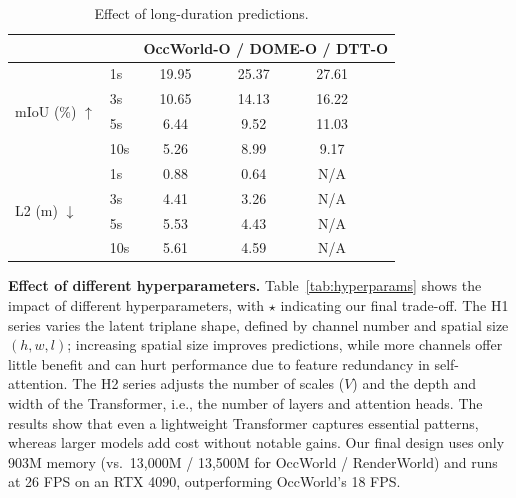 \documentclass[11pt,a4paper]{article}
\begin{document}
\begin{table}[htbp]
  \centering
  \caption{Effect of long-duration predictions.}
  \label{tab:longterm}
  \begin{tabular}{llcccc}
    \toprule
    & & \multicolumn{4}{c}{OccWorld-O / DOME-O / DTT-O} \\
    \midrule
    \multirow{4}{*}{mIoU (\%) $\uparrow$}
      & 1s  & 19.95 & 25.37 & 27.61 \\
      & 3s  & 10.65 & 14.13 & 16.22 \\
      & 5s  & 6.44  & 9.52  & 11.03 \\
      & 10s & 5.26  & 8.99  & 9.17  \\
    \midrule
    \multirow{4}{*}{L2 (m) $\downarrow$}
      & 1s  & 0.88  & 0.64  & N/A   \\
      & 3s  & 4.41  & 3.26  & N/A   \\
      & 5s  & 5.53  & 4.43  & N/A   \\
      & 10s & 5.61  & 4.59  & N/A   \\
    \bottomrule
  \end{tabular}
\end{table}

\textbf{Effect of different hyperparameters.}
Table~\ref{tab:hyperparams} shows the impact of different hyperparameters, with $\star$ indicating our final trade-off.
The H1 series varies the latent triplane shape, defined by channel number and spatial size $(h, w, l)$; increasing spatial size improves predictions, while more channels offer little benefit and can hurt performance due to feature redundancy in self-attention.
The H2 series adjusts the number of scales ($V$) and the depth and width of the Transformer, i.e., the number of layers and attention heads.
The results show that even a lightweight Transformer captures essential patterns, whereas larger models add cost without notable gains.
Our final design uses only 903M memory (vs.\ 13,000M / 13,500M for OccWorld / RenderWorld) and runs at 26 FPS on an RTX 4090, outperforming OccWorld's 18 FPS.
\end{document}
